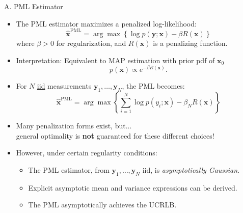 \documentclass{beamer}
\begin{document}
\begin{frame}{A. PML Estimator}
\begin{itemize}
    \item The PML estimator maximizes a penalized log-likelihood:
    \[
    \hat{\mathbf{x}}^{\text{PML}} = \arg\max \left\{ \log p(\mathbf{y}; \mathbf{x}) - \beta R(\mathbf{x}) \right\}
    \]
    where \( \beta > 0 \) for regularization, and \( R(\mathbf{x}) \) is a penalizing function.
    \item Interpretation: Equivalent to MAP estimation with prior pdf of $\mathbf{x}_0$ 
        \vspace{-5pt}
        \[ 
        p(\mathbf{x}) \propto e^{-\beta R(\mathbf{x})}. 
        \]
    \item For \(N\) \underline{iid} measurements \( \mathbf{y}_1, \ldots, \mathbf{y}_N \), the PML becomes:
    \[
    \hat{\mathbf{x}}^{\text{PML}} = \arg\max \left\{ \sum_{i=1}^{N} \log p(y_i; \mathbf{x}) - \beta_N R(\mathbf{x}) \right\}
    \]
    \item Many penalization forms exist, but... \\ general optimality is \textbf{not} guaranteed for these different choices!
    \item However, under certain regularity conditions:
    \begin{itemize}
        \item The PML estimator, from \( \mathbf{y}_1, \ldots, \mathbf{y}_N \) iid, is \textit{asymptotically Gaussian}.
        \item Explicit asymptotic mean and variance expressions can be derived.
        \item The PML asymptotically achieves the UCRLB.
    \end{itemize}
\end{itemize}
\end{frame}
\end{document}

